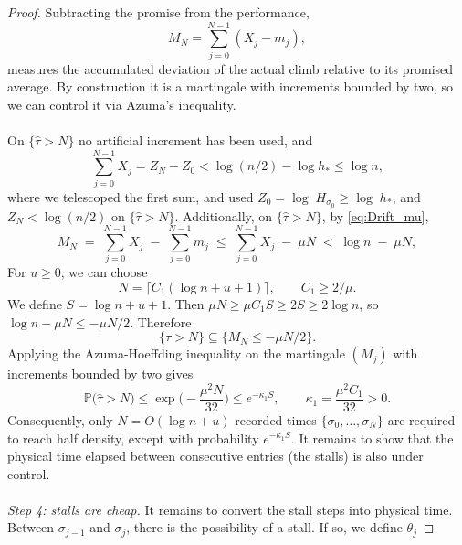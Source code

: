 \documentclass[
    aps,
    superscriptaddress,
    onecolumn,
    10pt,
    prx,
    nofootinbib
]{revtex4-2}
\theoremstyle{namedstatement}
\theoremstyle{plain}
\begin{document}
\begin{proof}
Subtracting the promise from the performance,
\begin{equation}
  M_N=\sum_{j=0}^{N-1}(X_j-m_j),
\end{equation}
measures the accumulated deviation of the actual climb relative to its promised
average. By construction it is a martingale with increments bounded by two, so we can control it via Azuma's inequality.
\\
\\
On $\{\widehat\tau>N\}$ no artificial increment has been used, and
\begin{equation}
  \sum_{j=0}^{N-1}X_j=Z_N-Z_0<\log(n/2)-\log h_\ast\le\log n,
\end{equation}
where we telescoped the first sum, and used $Z_0 = \log\; H_{\sigma_0} \geq \log\; h_*$, 
and $Z_N < \log(n/2)$ 
on $\{\widehat\tau>N\}$.
Additionally, on $\{\widehat\tau>N\}$, by \cref{eq:Drift_mu},
\begin{equation}
  M_N \;=\; \sum_{j=0}^{N-1}X_j \;-\; \sum_{j=0}^{N-1}m_j
  \;\le\; \sum_{j=0}^{N-1}X_j \;-\; \mu N
  \;<\; \log n \;-\; \mu N,
\end{equation}
For $u\ge0$, we can choose
\begin{equation}\label{eq:N-choice}
  N=\big\lceil C_1(\log n+u+1)\big\rceil,\qquad C_1\ge2/\mu.
\end{equation}
We define $S=\log n+u+1$. Then $\mu N \ge \mu C_1 S \ge 2S \ge 2\log n$, so $\log n-\mu N\le-\mu N/2$. Therefore
\begin{equation}
  \{\widehat\tau>N\}\subseteq\{M_N\le-\mu N/2\}.
\end{equation}
Applying the Azuma-Hoeffding inequality on the martingale $(M_j)$ with increments bounded by two gives
\begin{equation}\label{eq:tauhat-tail}
  \mathbb P\big(\widehat\tau>N\big)\le\exp\!\Big(-\frac{\mu^2N}{32}\Big)\le e^{-\kappa_1S},
  \qquad \kappa_1=\frac{\mu^2C_1}{32}>0.
\end{equation}
Consequently, only $N=O(\log n+u)$ recorded times $\{\sigma_0,\dots,\sigma_N\}$ are required to reach half density, except with probability $e^{-\kappa_1 S}$. It remains to show that the physical time elapsed between consecutive entries (the stalls) is also under control.
\\
\\
\medskip\noindent\emph{Step 4: stalls are cheap.}
It remains to convert the stall steps into physical time. Between $\sigma_{j-1}$ and $\sigma_{j}$, there is the possibility of a stall. If so, we define $\theta_j$

\end{proof}
\end{document}
